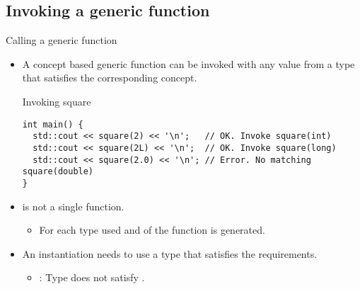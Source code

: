 \subsection{Invoking a generic function} 

\begin{frame}[t,fragile]{Calling a generic function}
\begin{itemize}
  \item A concept based generic function can be invoked with any value from
        a type that satisfies the corresponding concept.
\begin{block}{Invoking square}
\begin{lstlisting}
int main() {
  std::cout << square(2) << '\n';   // OK. Invoke square(int)
  std::cout << square(2L) << '\n';  // OK. Invoke square(long)
  std::cout << square(2.0) << '\n'; // Error. No matching square(double)
}
\end{lstlisting}
\end{block}

  \item {} is not a single function.
    \begin{itemize}
      \item For each type used and  of the function is generated.
    \end{itemize}

  \item An instantiation needs to use a type that satisfies the requirements.
    \begin{itemize}
      \item {}: Type  does not satisfy .
    \end{itemize}
\end{itemize}

\end{frame}


